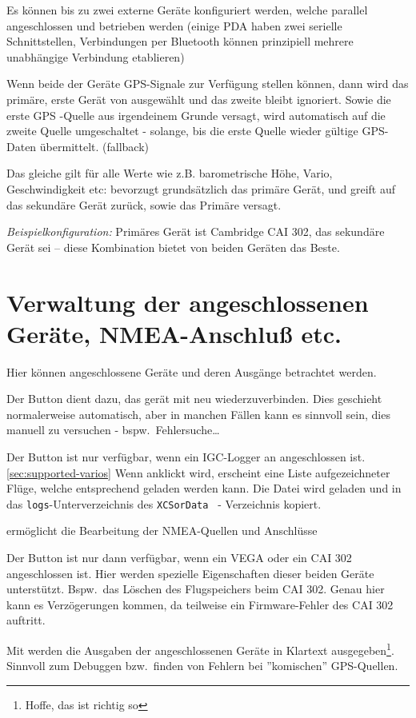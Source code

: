 Es können bis zu zwei externe Geräte konfiguriert werden, welche parallel angeschlossen und betrieben werden (einige \textsf{PDA} haben zwei serielle Schnittstellen, Verbindungen per Bluetooth können prinzipiell mehrere unabhängige Verbindung etablieren)

Wenn  beide der Geräte GPS-Signale zur Verfügung stellen können, dann wird das primäre, erste Gerät von \xc ausgewählt und das zweite bleibt ignoriert. Sowie die erste GPS -Quelle aus irgendeinem Grunde versagt, wird automatisch auf die zweite Quelle umgeschaltet - solange, bis die erste Quelle wieder gültige GPS-Daten übermittelt. (fallback)

Das gleiche gilt für alle Werte wie z.B. barometrische Höhe, Vario, Geschwindigkeit etc:
\xc bevorzugt grundsätzlich das primäre Gerät, und greift auf das sekundäre Gerät zurück, sowie das Primäre versagt.

\textit{Beispielkonfiguration:}
Primäres Gerät ist Cambridge CAI 302, das sekundäre Gerät sei \fl -- diese Kombination bietet von beiden Geräten das Beste.
\section{Verwaltung der angeschlossenen Geräte, NMEA-Anschluß etc.\ }

Hier können angeschlossene Geräte und deren Ausgänge betrachtet werden.

Der Button  dient dazu, das gerät mit \xc neu  
wiederzuverbinden. Dies geschieht normalerweise automatisch, aber in manchen Fällen kann es sinnvoll sein, dies manuell zu versuchen - bspw.\ Fehlersuche\dots

Der Button  ist nur verfügbar, wenn ein IGC-Logger an \xc angeschlossen ist. \ref{sec:supported-varios}
Wenn anklickt wird, erscheint eine Liste aufgezeichneter Flüge, welche entsprechend geladen werden kann. Die Datei wird geladen und in das \texttt{logs}-Unterverzeichnis des \texttt{XCSorData } - Verzeichnis kopiert.

 ermöglicht die Bearbeitung der NMEA-Quellen und Anschlüsse

Der Button  ist nur dann verfügbar, wenn ein VEGA oder ein CAI 302 angeschlossen ist. Hier werden spezielle Eigenschaften dieser beiden Geräte unterstützt. Bspw.\ das Löschen des Flugspeichers beim CAI 302. \warning Genau hier kann es Verzögerungen kommen, da teilweise ein Firmware-Fehler des CAI 302 auftritt.

Mit  werden die Ausgaben der angeschlossenen Geräte in Klartext  ausgegeben\footnote{Hoffe, das ist richtig so}. 
Sinnvoll zum Debuggen bzw.\ finden von Fehlern bei ''komischen'' GPS-Quellen.
